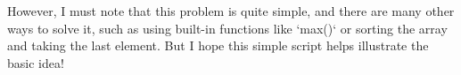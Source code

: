 \documentclass[preview]{standalone}
\begin{document}
However, I must note that this problem is quite simple, and there are many other ways to solve it, such as using built-in functions like `max()` or sorting the array and taking the last element. But I hope this simple script helps illustrate the basic idea!\\
\end{document}
